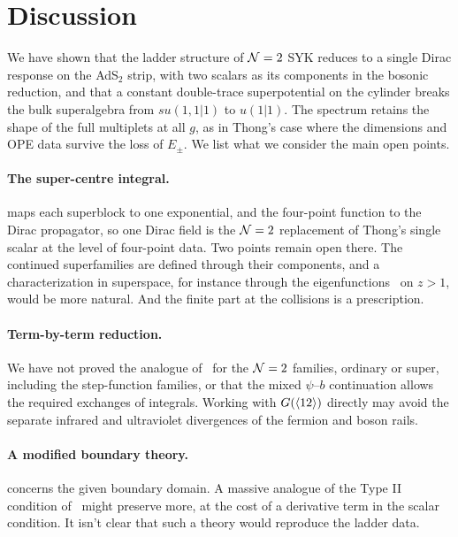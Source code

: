 \section{Discussion}
\label{sec:discussion}

We have shown that the ladder structure of $\mathcal{N}=2$ SYK reduces to a single Dirac response on the AdS$_2$ strip, with two scalars as its components in the bosonic reduction, and that a constant double-trace superpotential on the cylinder breaks the bulk superalgebra from $su(1,1|1)$ to $u(1|1)$. The spectrum retains the shape of the full multiplets at all $g$, as in Thong's case where the dimensions and OPE data survive the loss of $E_\pm$. We list what we consider the main open points.

\paragraph{The super-centre integral.}  maps each superblock to one exponential, and the four-point function to the Dirac propagator, so one Dirac field is the $\mathcal{N}=2$ replacement of Thong's single scalar at the level of four-point data. Two points remain open there. The continued superfamilies are defined through their components, and a characterization in superspace, for instance through the eigenfunctions~\cite[(4.40)]{Bulycheva:2018qcp} on $z>1$, would be more natural. And the finite part at the collisions is a prescription.

\paragraph{Term-by-term reduction.} We have not proved the analogue of~\cite[App.~C.2]{Thong:2026} for the $\mathcal{N}=2$ families, ordinary or super, including the step-function families, or that the mixed $\psi$--$b$ continuation allows the required exchanges of integrals. Working with $G(\langle 12\rangle)$ directly may avoid the separate infrared and ultraviolet divergences of the fermion and boson rails.

\paragraph{A modified boundary theory.}  concerns the given boundary domain. A massive analogue of the Type II condition of~\cite{Correa:2019rdk} might preserve more, at the cost of a derivative term in the scalar condition. It isn't clear that such a theory would reproduce the ladder data.

